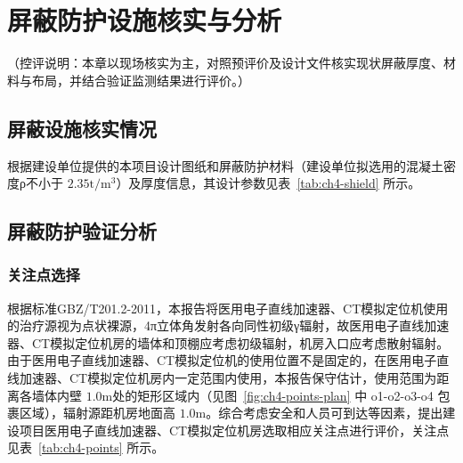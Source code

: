 





\section{屏蔽防护设施核实与分析}

（控评说明：本章以现场核实为主，对照预评价及设计文件核实现状屏蔽厚度、材料与布局，并结合验证监测结果进行评价。）


\subsection{屏蔽设施核实情况}

根据建设单位提供的本项目设计图纸和屏蔽防护材料（建设单位拟选用的混凝土密度ρ不小于 $2 . 3 5 \mathrm { t } / \mathrm { m } ^ { 3 }$）及厚度信息，其设计参数见表~\ref{tab:ch4-shield} 所示。





\subsection{屏蔽防护验证分析}

\subsubsection{关注点选择}

根据标准GBZ/T201.2-2011，本报告将医用电子直线加速器、CT模拟定位机使用的治疗源视为点状裸源，4π立体角发射各向同性初级γ辐射，故医用电子直线加速器、CT模拟定位机房的墙体和顶棚应考虑初级辐射，机房入口应考虑散射辐射。由于医用电子直线加速器、CT模拟定位机的使用位置不是固定的，在医用电子直线加速器、CT模拟定位机房内一定范围内使用，本报告保守估计，使用范围为距离各墙体内壁 $1 . 0 \mathrm { m }$处的矩形区域内（见图~\ref{fig:ch4-points-plan} 中 o1-o2-o3-o4 包裹区域），辐射源距机房地面高 $1 . 0 \mathrm { m }$。综合考虑安全和人员可到达等因素，提出建设项目医用电子直线加速器、CT模拟定位机房选取相应关注点进行评价，关注点见表~\ref{tab:ch4-points} 所示。


